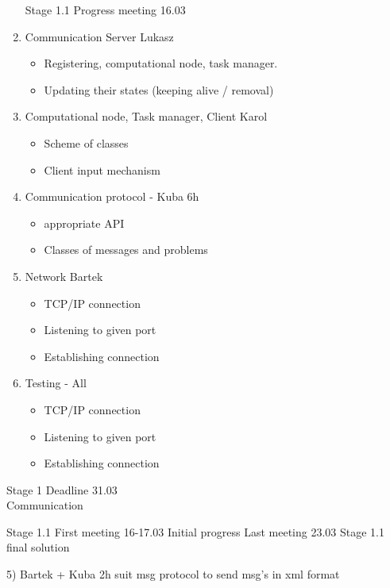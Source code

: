\documentclass{article}
\begin{document}
\begin{enumerate}
	Stage 1.1 Progress meeting 16.03
		\item Communication Server Lukasz
		\begin{itemize}
				\item Registering, computational node,
				 task manager.
				 \item Updating their states (keeping alive / removal)			
		\end{itemize}
		
		\item Computational node, Task manager, Client Karol
		\begin{itemize}
				\item Scheme of classes
				\item Client input mechanism
		\end{itemize}		


		\item Communication protocol - Kuba 6h
		\begin{itemize}
				\item appropriate API
				\item Classes of messages and problems	
		\end{itemize}


		\item Network Bartek
		\begin{itemize}
				\item TCP/IP connection
				\item Listening to given port
				\item Establishing connection
		\end{itemize}


		\item Testing - All
		\begin{itemize}
				\item TCP/IP connection
				\item Listening to given port
				\item Establishing connection
		\end{itemize}		
					
\end{enumerate}

Stage 1 Deadline 31.03\\
Communication

Stage 1.1 First meeting 16-17.03 Initial progress
		Last meeting 23.03 Stage 1.1 final solution
			
	
5) Bartek + Kuba 2h
	suit msg protocol to send msg's in xml format
	
\end{document}

